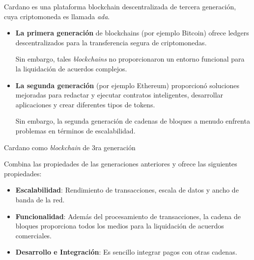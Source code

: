 \documentclass{beamer}
\newcommand{\nologo}{\setbeamertemplate{logo}{}} %
\begin{document}
{\nologo
\begin{frame}
Cardano es una plataforma blockchain descentralizada de tercera generación, cuya criptomoneda es llamada \textit{ada}. 

\vfill
\pause

\begin{itemize}
    \item \textbf{La primera generación} de blockchains (por ejemplo Bitcoin) ofrece ledgers descentralizados para la transferencia segura de criptomonedas. 
    \smallskip

    \pause Sin embargo, tales \textit{blockchains} no proporcionaron un entorno funcional para la liquidación de acuerdos complejos.
    \pause
    \vfill

    \item \textbf{La segunda generación} (por ejemplo Ethereum) proporcionó soluciones mejoradas para redactar y ejecutar contratos inteligentes, desarrollar aplicaciones y crear diferentes tipos de tokens.
    \smallskip

    \pause Sin embargo, la segunda generación de cadenas de bloques a menudo enfrenta problemas en términos de escalabilidad.
\end{itemize}
\end{frame}
}

\begin{frame}{Cardano como \textit{blockchain} de 3ra generación}

Combina las propiedades de las generaciones anteriores y ofrece las siguientes propiedades:
\vfill
\pause

\begin{itemize}
    \item \textbf{Escalabilidad}: Rendimiento de transacciones, escala de datos y ancho de banda de la red.
        \pause
    \item \textbf{Funcionalidad}: Además del procesamiento de transacciones, la cadena de bloques proporciona todos los medios para la liquidación de acuerdos comerciales. 
        \pause
    \item \textbf{Desarrollo e Integración}: Es sencillo integrar pagos con otras cadenas.
\end{itemize} 

\end{frame}
\end{document}
